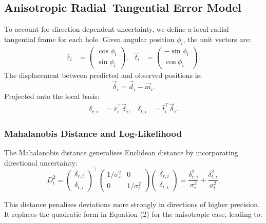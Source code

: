 \documentclass[a4paper,12pt]{article}
\begin{document}
\subsection{Anisotropic Radial–Tangential Error Model}

To account for direction-dependent uncertainty, we define a local radial–tangential frame for each hole. Given angular position $\phi_i$, the unit vectors are:
\begin{align}
    \hat{r}_i &= \begin{pmatrix} \cos\phi_i \\ \sin\phi_i \end{pmatrix}, &
    \hat{t}_i &= \begin{pmatrix} -\sin\phi_i \\ \cos\phi_i \end{pmatrix}.
\end{align}
The displacement between predicted and observed positions is:
\begin{equation}
    \vec{\delta}_i = \vec{d}_i - \vec{m}_i.
\end{equation}
Projected onto the local basis:
\begin{align}
    \delta_{r,i} &= \hat{r}_i^\top \vec{\delta}_i, &
    \delta_{t,i} &= \hat{t}_i^\top \vec{\delta}_i.
\end{align}

\subsubsection*{Mahalanobis Distance and Log-Likelihood}

The Mahalanobis distance generalises Euclidean distance by incorporating directional uncertainty:
\begin{equation}
    D_i^2 = \begin{pmatrix} \delta_{r,i} \\ \delta_{t,i} \end{pmatrix}^\top
            \begin{pmatrix} 1/\sigma_r^2 & 0 \\ 0 & 1/\sigma_t^2 \end{pmatrix}
            \begin{pmatrix} \delta_{r,i} \\ \delta_{t,i} \end{pmatrix}
          = \frac{\delta_{r,i}^2}{\sigma_r^2} + \frac{\delta_{t,i}^2}{\sigma_t^2}.
\end{equation}

This distance penalises deviations more strongly in directions of higher precision. It replaces the quadratic form in Equation (2) for the anisotropic case, leading to:
\end{document}

